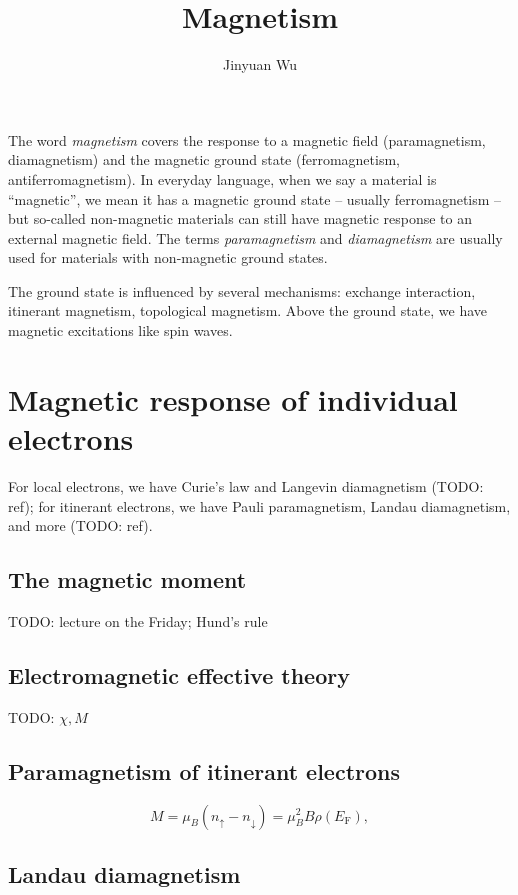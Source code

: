 \documentclass[hyperref, a4paper]{article}
\title{Magnetism}
\author{Jinyuan Wu}
\newcommand*{\term}[1]{\textit{#1}}
\newcommand*{\efermi}{E_{\text{F}}}
\begin{document}
\maketitle

The word \term{magnetism} covers the response to a magnetic field 
(paramagnetism, diamagnetism)
and the magnetic ground state 
(ferromagnetism, antiferromagnetism).
In everyday language,
when we say a material is ``magnetic'',
we mean it has a magnetic ground state -- usually ferromagnetism -- 
but so-called non-magnetic materials 
can still have magnetic response 
to an external magnetic field.
The terms \term{paramagnetism} and \term{diamagnetism} 
are usually used for materials with non-magnetic ground states.

The ground state is influenced by several mechanisms:
exchange interaction, 
itinerant magnetism,
topological magnetism.
Above the ground state, we have magnetic excitations like spin waves.

\section{Magnetic response of individual electrons}

For local electrons, 
we have Curie's law and Langevin diamagnetism (TODO: ref);
for itinerant electrons,
we have Pauli paramagnetism,
Landau diamagnetism, and more (TODO: ref). 

\subsection{The magnetic moment}

TODO: lecture on the Friday; Hund's rule 

\subsection{Electromagnetic effective theory}

TODO: $\chi, M$

\subsection{Paramagnetism of itinerant electrons}

\begin{equation}
    M = \mu_{B} (n_\uparrow - n_\downarrow) = \mu_B^2 B \rho(\efermi),
\end{equation}

\subsection{Landau diamagnetism}
\end{document}
